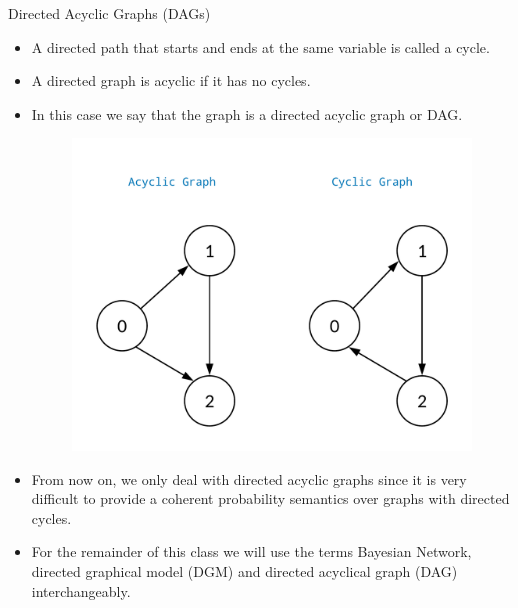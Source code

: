 \documentclass[handout]{beamer}
\begin{document}
\begin{frame}{Directed Acyclic Graphs (DAGs)}
\scriptsize{
\begin{itemize}
\item A directed path that starts and ends at the same variable is called a cycle.

\item A directed graph is acyclic if it has no cycles. 

\item In this case we say that the graph is a directed
acyclic graph or DAG. 


\begin{figure}[h!]
	\centering
	\includegraphics[scale=0.12]{pics/cycle.png}
	\end{figure} 



\item From now on, we only deal with directed acyclic graphs since it is very difficult to provide a coherent probability semantics over graphs with directed cycles.
 
\item For the remainder of this class we will use the terms Bayesian Network, directed graphical model (DGM) and directed acyclical graph (DAG) interchangeably. 
 
 
\end{itemize}



} 

\end{frame}
\end{document}
